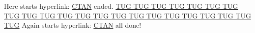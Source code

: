 \documentclass[a4paper,dvipdfmx]{article}
\begin{document}
Here starts hyperlink:
\href{https://ctan.org/}{CTAN} ended.
\href{https://tug.org/}%
{TUG TUG TUG TUG TUG TUG TUG TUG TUG TUG TUG
 TUG TUG TUG TUG TUG TUG TUG TUG TUG TUG TUG}
Again starts hyperlink: \href{https://ctan.org/}{CTAN} all done!
\end{document}
